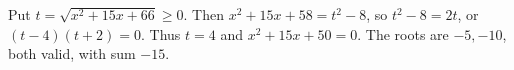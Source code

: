 Put $t=\sqrt{x^2+15x+66}\ge0$. Then $x^2+15x+58=t^2-8$, so $t^2-8=2t$, or $(t-4)(t+2)=0$. Thus $t=4$ and $x^2+15x+50=0$. The roots are $-5,-10$, both valid, with sum $\boxed{-15}$.
